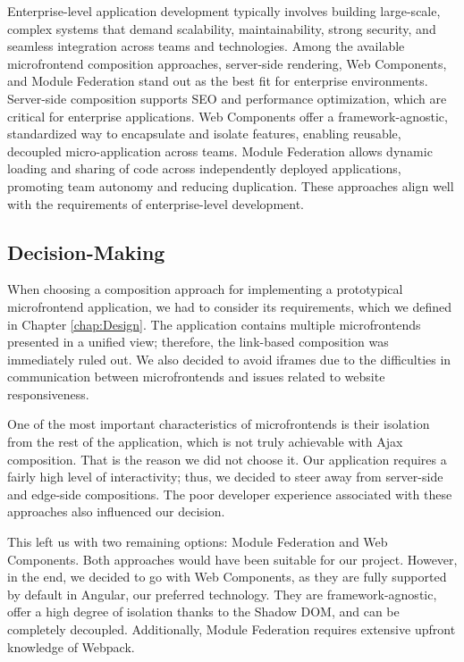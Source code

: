 Enterprise-level application development typically involves building large-scale, complex systems that demand scalability, maintainability, strong security, and seamless integration across teams and technologies. Among the available microfrontend composition approaches, server-side rendering, Web Components, and Module Federation stand out as the best fit for enterprise environments. Server-side composition supports SEO and performance optimization, which are critical for enterprise applications. Web Components offer a framework-agnostic, standardized way to encapsulate and isolate features, enabling reusable, decoupled micro-application across teams. Module Federation allows dynamic loading and sharing of code across independently deployed applications, promoting team autonomy and reducing duplication. These approaches align well with the requirements of enterprise-level development.

\subsection{Decision-Making}
When choosing a composition approach for implementing a prototypical microfrontend application, we had to consider its requirements, which we defined in Chapter \ref{chap:Design}. The application contains multiple microfrontends presented in a unified view; therefore, the link-based composition was immediately ruled out. We also decided to avoid iframes due to the difficulties in communication between microfrontends and issues related to website responsiveness.

One of the most important characteristics of microfrontends is their isolation from the rest of the application, which is not truly achievable with Ajax composition. That is the reason we did not choose it. Our application requires a fairly high level of interactivity; thus, we decided to steer away from server-side and edge-side compositions. The poor developer experience associated with these approaches also influenced our decision.

This left us with two remaining options: Module Federation and Web Components. Both approaches would have been suitable for our project. However, in the end, we decided to go with Web Components, as they are fully supported by default in Angular, our preferred technology. They are framework-agnostic, offer a high degree of isolation thanks to the Shadow DOM, and can be completely decoupled. Additionally, Module Federation requires extensive upfront knowledge of Webpack.